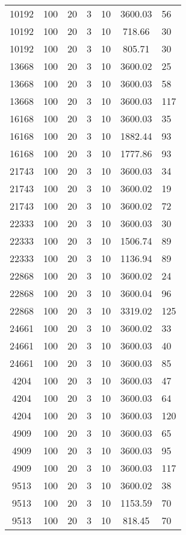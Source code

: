 \begin{tabular}[center]{cccccc}
  10192 & 100 & 20 & 3 & 10 & 3600.03 & 56  \\
10192   & 100 & 20 & 3 & 10 & 718.66  & 30  \\
10192   & 100 & 20 & 3 & 10 & 805.71  & 30  \\
13668   & 100 & 20 & 3 & 10 & 3600.02 & 25  \\
13668   & 100 & 20 & 3 & 10 & 3600.03 & 58  \\
13668   & 100 & 20 & 3 & 10 & 3600.03 & 117 \\
16168   & 100 & 20 & 3 & 10 & 3600.03 & 35  \\
16168   & 100 & 20 & 3 & 10 & 1882.44 & 93  \\
16168   & 100 & 20 & 3 & 10 & 1777.86 & 93  \\
21743   & 100 & 20 & 3 & 10 & 3600.03 & 34  \\
21743   & 100 & 20 & 3 & 10 & 3600.02 & 19  \\
21743   & 100 & 20 & 3 & 10 & 3600.02 & 72  \\
22333   & 100 & 20 & 3 & 10 & 3600.03 & 30  \\
22333   & 100 & 20 & 3 & 10 & 1506.74 & 89  \\
22333   & 100 & 20 & 3 & 10 & 1136.94 & 89  \\
22868   & 100 & 20 & 3 & 10 & 3600.02 & 24  \\
22868   & 100 & 20 & 3 & 10 & 3600.04 & 96  \\
22868   & 100 & 20 & 3 & 10 & 3319.02 & 125 \\
24661   & 100 & 20 & 3 & 10 & 3600.02 & 33  \\
24661   & 100 & 20 & 3 & 10 & 3600.03 & 40  \\
24661   & 100 & 20 & 3 & 10 & 3600.03 & 85  \\
4204    & 100 & 20 & 3 & 10 & 3600.03 & 47  \\
4204    & 100 & 20 & 3 & 10 & 3600.03 & 64  \\
4204    & 100 & 20 & 3 & 10 & 3600.03 & 120 \\
4909    & 100 & 20 & 3 & 10 & 3600.03 & 65  \\
4909    & 100 & 20 & 3 & 10 & 3600.03 & 95  \\
4909    & 100 & 20 & 3 & 10 & 3600.03 & 117 \\
9513    & 100 & 20 & 3 & 10 & 3600.02 & 38  \\
9513    & 100 & 20 & 3 & 10 & 1153.59 & 70  \\
9513    & 100 & 20 & 3 & 10 & 818.45  & 70  \\

\end{tabular}
